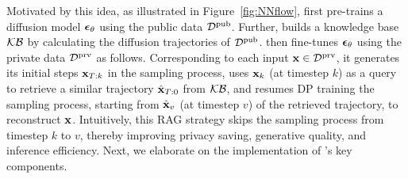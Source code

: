 Motivated by this idea, as illustrated in Figure~\ref{fig:NNflow}, \system first pre-trains a diffusion model $\bm{\epsilon}_\theta$ using the public data ${\mathcal{D}}^\mathrm{pub}$. Further, \system builds a knowledge base ${\mathcal{K}}{\mathcal{B}}$ by calculating the diffusion trajectories of ${\mathcal{D}}^\mathrm{pub}$. \system then fine-tunes $\bm{\epsilon}_\theta$ using the private data ${\mathcal{D}}^\mathrm{prv}$ as follows. Corresponding to each input ${\mathbf{x}} \in {\mathcal{D}}^\mathrm{prv}$, it generates its initial steps ${\mathbf{x}}_{T : k}$ in the sampling process, uses ${\mathbf{x}}_k$ (at timestep $k$) as a query to retrieve a similar trajectory $\hat{{\mathbf{x}}}_{T : 0}$ from ${\mathcal{K}}{\mathcal{B}}$, and resumes DP training the sampling process, starting from $\hat{{\mathbf{x}}}_v$ (at timestep $v$) of the retrieved trajectory, to reconstruct ${\mathbf{x}}$.
Intuitively, this RAG strategy skips the sampling process from timestep $k$ to $v$, thereby improving privacy saving, generative quality, and inference efficiency. Next, we elaborate on the implementation of \system's key components.







